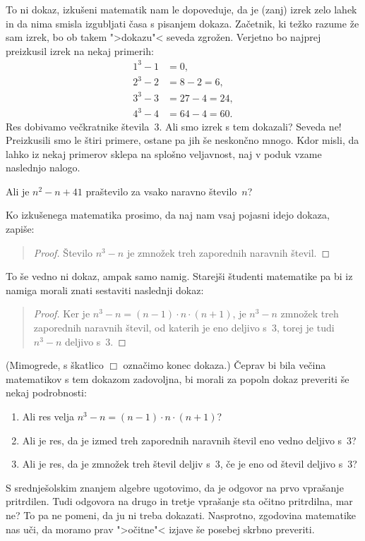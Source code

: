 \noindent
To ni dokaz, izkušeni matematik nam le dopoveduje, da je (zanj) izrek
zelo lahek in da nima smisla izgubljati časa s pisanjem dokaza.
Začetnik, ki težko razume že sam izrek, bo ob takem ">dokazu"< seveda
zgrožen. Verjetno bo najprej preizkusil izrek na nekaj primerih:
%
\begin{align*}
  1^3 - 1 &= 0,\\
  2^3 - 2 &= 8 - 2 = 6,\\
  3^3 - 3 &= 27 - 4 = 24,\\
  4^3 - 4 &= 64 - 4 = 60.
\end{align*}
%
Res dobivamo večkratnike števila~$3$. Ali smo izrek s tem dokazali? Seveda ne!
Preizkusili smo le štiri primere, ostane pa jih še neskončno mnogo. Kdor
misli, da lahko iz nekaj primerov sklepa na splošno veljavnost, naj v poduk
vzame naslednjo nalogo.

\begin{vaja}
  Ali je $n^2 - n + 41$ praštevilo za vsako naravno število~$n$?
\end{vaja}

\noindent
Ko izkušenega matematika prosimo, da naj nam vsaj pojasni idejo dokaza,
zapiše:

\begin{quote}
  \begin{proof}
    Število $n^3 - n$ je zmnožek treh zaporednih naravnih števil.
  \end{proof}
\end{quote}

\noindent
To še vedno ni dokaz, ampak samo namig. Starejši študenti matematike pa
bi iz namiga morali znati sestaviti naslednji dokaz:

\begin{quote}
  \begin{proof}
    Ker je $n^3 - n = (n-1) \cdot n \cdot (n+1)$, je $n^3 - n$ zmnožek
    treh zaporednih naravnih števil, od katerih je eno deljivo s~$3$,
    torej je tudi $n^3 - n$ deljivo s~$3$.
  \end{proof}
\end{quote}

\noindent
(Mimogrede, s škatlico $\Box$ označimo konec dokaza.) Čeprav bi bila
večina matematikov s tem dokazom zadovoljna, bi morali za popoln dokaz
preveriti še nekaj podrobnosti:
%
\begin{enumerate}
\item Ali res velja $n^3 - n = (n-1) \cdot n \cdot (n+1)$?
\item Ali je res, da je izmed treh zaporednih naravnih števil eno
  vedno deljivo s~$3$?
\item Ali je res, da je zmnožek treh števil deljiv s~$3$, če je eno od
  števil deljivo s~$3$?
\end{enumerate}
%
S srednješolskim znanjem algebre ugotovimo, da je odgovor na prvo
vprašanje pritrdilen. Tudi odgovora na drugo in tretje vprašanje sta
očitno pritrdilna, mar ne? To pa ne pomeni, da ju ni treba dokazati.
Nasprotno, zgodovina matematike nas uči, da moramo prav ">očitne"<
izjave še posebej skrbno preveriti.

